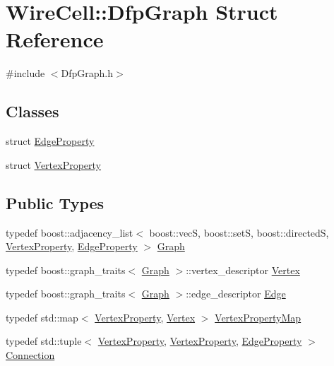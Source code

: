 \hypertarget{struct_wire_cell_1_1_dfp_graph}{}\section{Wire\+Cell\+:\+:Dfp\+Graph Struct Reference}
\label{struct_wire_cell_1_1_dfp_graph}


{\ttfamily \#include $<$Dfp\+Graph.\+h$>$}

\subsection*{Classes}
\begin{DoxyCompactItemize}
\item 
struct \hyperlink{struct_wire_cell_1_1_dfp_graph_1_1_edge_property}{Edge\+Property}
\item 
struct \hyperlink{struct_wire_cell_1_1_dfp_graph_1_1_vertex_property}{Vertex\+Property}
\end{DoxyCompactItemize}
\subsection*{Public Types}
\begin{DoxyCompactItemize}
\item 
typedef boost\+::adjacency\+\_\+list$<$ boost\+::vecS, boost\+::setS, boost\+::directedS, \hyperlink{struct_wire_cell_1_1_dfp_graph_1_1_vertex_property}{Vertex\+Property}, \hyperlink{struct_wire_cell_1_1_dfp_graph_1_1_edge_property}{Edge\+Property} $>$ \hyperlink{struct_wire_cell_1_1_dfp_graph_ad5dd2546b355a72f5f24e90a985a45e9}{Graph}
\item 
typedef boost\+::graph\+\_\+traits$<$ \hyperlink{struct_wire_cell_1_1_dfp_graph_ad5dd2546b355a72f5f24e90a985a45e9}{Graph} $>$\+::vertex\+\_\+descriptor \hyperlink{struct_wire_cell_1_1_dfp_graph_a2f38c4e60540b0b3e530b7b8588f7725}{Vertex}
\item 
typedef boost\+::graph\+\_\+traits$<$ \hyperlink{struct_wire_cell_1_1_dfp_graph_ad5dd2546b355a72f5f24e90a985a45e9}{Graph} $>$\+::edge\+\_\+descriptor \hyperlink{struct_wire_cell_1_1_dfp_graph_af3fc4fb6130bbad095ffe90480d59998}{Edge}
\item 
typedef std\+::map$<$ \hyperlink{struct_wire_cell_1_1_dfp_graph_1_1_vertex_property}{Vertex\+Property}, \hyperlink{struct_wire_cell_1_1_dfp_graph_a2f38c4e60540b0b3e530b7b8588f7725}{Vertex} $>$ \hyperlink{struct_wire_cell_1_1_dfp_graph_a3908c3dc81685f845df6243825cc6021}{Vertex\+Property\+Map}
\item 
typedef std\+::tuple$<$ \hyperlink{struct_wire_cell_1_1_dfp_graph_1_1_vertex_property}{Vertex\+Property}, \hyperlink{struct_wire_cell_1_1_dfp_graph_1_1_vertex_property}{Vertex\+Property}, \hyperlink{struct_wire_cell_1_1_dfp_graph_1_1_edge_property}{Edge\+Property} $>$ \hyperlink{struct_wire_cell_1_1_dfp_graph_a2411a46952a0b08b986e57ce0100ce21}{Connection}
\end{DoxyCompactItemize}
